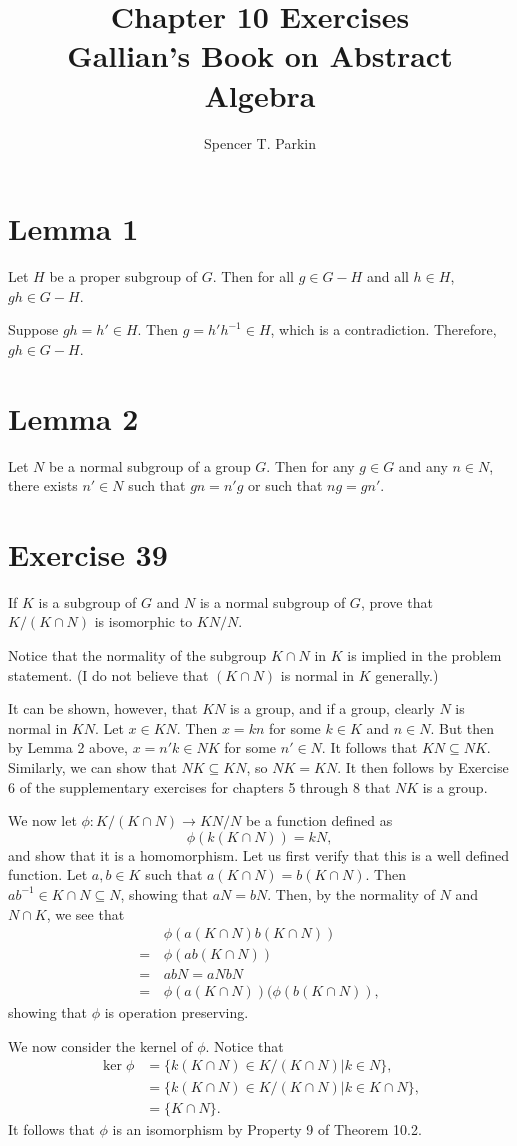 \documentclass[12pt]{article}
\title{Chapter 10 Exercises\\Gallian's Book on Abstract Algebra}
\author{Spencer T. Parkin}
\begin{document}
\maketitle

\section*{Lemma 1}

Let $H$ be a proper subgroup of $G$.  Then
for all $g\in G-H$ and all $h\in H$, $gh\in G-H$.

Suppose $gh=h'\in H$.  Then $g=h'h^{-1}\in H$,
which is a contradiction.  Therefore, $gh\in G-H$.

\section*{Lemma 2}

Let $N$ be a normal subgroup of a group $G$.
Then for any $g\in G$ and any $n\in N$,
there exists $n'\in N$ such that $gn=n'g$ or such that $ng=gn'$.

\section*{Exercise 39}

If $K$ is a subgroup of $G$ and $N$ is a normal subgroup of $G$,
prove that $K/(K\cap N)$ is isomorphic to $KN/N$.

Notice that the normality of the subgroup $K\cap N$ in $K$ is
implied in the problem statement.  (I do not believe that
$(K\cap N)$ is normal in $K$ generally.)

It can be shown, however, that $KN$ is a group, and if a group,
clearly $N$ is normal in $KN$.
Let $x\in KN$.  Then $x=kn$ for some $k\in K$ and $n\in N$.
But then by Lemma 2 above, $x=n'k\in NK$ for some $n'\in N$.
It follows that $KN\subseteq NK$.
Similarly, we can show that $NK\subseteq KN$, so $NK=KN$.
It then follows by Exercise 6 of the supplementary exercises
for chapters 5 through 8 that $NK$ is a group.

We now let $\phi:K/(K\cap N)\to KN/N$ be a function defined as
\begin{equation*}
\phi(k(K\cap N))=kN,
\end{equation*}
and show that it is a homomorphism.  Let us first verify that this
is a well defined function.  Let $a,b\in K$ such that $a(K\cap N)=b(K\cap N)$.
Then $ab^{-1}\in K\cap N\subseteq N$, showing that $aN=bN$.
Then, by the normality of $N$ and $N\cap K$, we see that
\begin{align*}
 & \phi(a(K\cap N)b(K\cap N)) \\
=\,& \phi(ab(K\cap N)) \\
 =\,& abN=aNbN \\
 =\,& \phi(a(K\cap N))(\phi(b(K\cap N)),
\end{align*}
showing that $\phi$ is operation preserving.

We now consider the kernel of $\phi$.  Notice that
\begin{align*}
\ker\phi &= \{k(K\cap N)\in K/(K\cap N)|k\in N\}, \\
 &= \{k(K\cap N)\in K/(K\cap N)|k\in K\cap N\}, \\
 &= \{K\cap N\}.
\end{align*}
It follows that $\phi$ is an isomorphism by Property 9
of Theorem 10.2.
\end{document}

